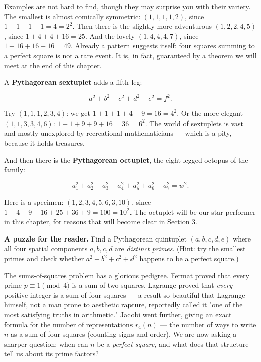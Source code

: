 \documentclass[11pt,twoside,openright]{book}
\theoremstyle{definition}
\theoremstyle{remark}
\begin{document}
Examples are not hard to find, though they may surprise you with their variety. The smallest is almost comically symmetric: $(1, 1, 1, 1, 2)$, since $1 + 1 + 1 + 1 = 4 = 2^2$. Then there is the slightly more adventurous $(1, 2, 2, 4, 5)$, since $1 + 4 + 4 + 16 = 25$. And the lovely $(1, 4, 4, 4, 7)$, since $1 + 16 + 16 + 16 = 49$. Already a pattern suggests itself: four squares summing to a perfect square is not a rare event. It is, in fact, guaranteed by a theorem we will meet at the end of this chapter.

A \textbf{Pythagorean sextuplet} adds a fifth leg:

\[a^2 + b^2 + c^2 + d^2 + e^2 = f^2.\]

Try $(1, 1, 1, 2, 3, 4)$: we get $1 + 1 + 1 + 4 + 9 = 16 = 4^2$. Or the more elegant $(1, 1, 3, 3, 4, 6)$: $1 + 1 + 9 + 9 + 16 = 36 = 6^2$. The world of sextuplets is vast and mostly unexplored by recreational mathematicians --- which is a pity, because it holds treasures.

And then there is the \textbf{Pythagorean octuplet}, the eight-legged octopus of the family:

\[a_1^2 + a_2^2 + a_3^2 + a_4^2 + a_5^2 + a_6^2 + a_7^2 = w^2.\]

Here is a specimen: $(1, 2, 3, 4, 5, 6, 3, 10)$, since $1 + 4 + 9 + 16 + 25 + 36 + 9 = 100 = 10^2$. The octuplet will be our star performer in this chapter, for reasons that will become clear in Section 3.



\textbf{A puzzle for the reader.} Find a Pythagorean quintuplet $(a, b, c, d, e)$ where all four spatial components $a, b, c, d$ are \textit{distinct primes}. (Hint: try the smallest primes and check whether $a^2 + b^2 + c^2 + d^2$ happens to be a perfect square.)

The sums-of-squares problem has a glorious pedigree. Fermat proved that every prime $p \equiv 1 \pmod{4}$ is a sum of two squares. Lagrange proved that \textit{every} positive integer is a sum of four squares --- a result so beautiful that Lagrange himself, not a man prone to aesthetic rapture, reportedly called it "one of the most satisfying truths in arithmetic." Jacobi went further, giving an exact formula for the number of representations $r_4(n)$ --- the number of ways to write $n$ as a sum of four squares (counting signs and order). We are now asking a sharper question: when can $n$ be a \textit{perfect square}, and what does that structure tell us about its prime factors?
\end{document}

